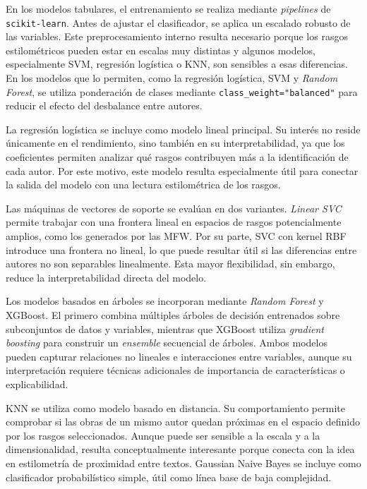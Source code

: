 \documentclass[IB]{TFUOC}%
\begin{document}
En los modelos tabulares, el entrenamiento se realiza mediante \textit{pipelines} de \texttt{scikit-learn}. Antes de ajustar el clasificador, se aplica un escalado robusto de las variables. Este preprocesamiento interno resulta necesario porque los rasgos estilométricos pueden estar en escalas muy distintas y algunos modelos, especialmente SVM, regresión logística o KNN, son sensibles a esas diferencias. En los modelos que lo permiten, como la regresión logística, SVM y \textit{Random Forest}, se utiliza ponderación de clases mediante \texttt{class\_weight="balanced"} para reducir el efecto del desbalance entre autores.

La regresión logística se incluye como modelo lineal principal. Su interés no reside únicamente en el rendimiento, sino también en su interpretabilidad, ya que los coeficientes permiten analizar qué rasgos contribuyen más a la identificación de cada autor. Por este motivo, este modelo resulta especialmente útil para conectar la salida del modelo con una lectura estilométrica de los rasgos.

Las máquinas de vectores de soporte se evalúan en dos variantes. \textit{Linear SVC} permite trabajar con una frontera lineal en espacios de rasgos potencialmente amplios, como los generados por las MFW. Por su parte, SVC con kernel RBF introduce una frontera no lineal, lo que puede resultar útil si las diferencias entre autores no son separables linealmente. Esta mayor flexibilidad, sin embargo, reduce la interpretabilidad directa del modelo.

Los modelos basados en árboles se incorporan mediante \textit{Random Forest} y XGBoost. El primero combina múltiples árboles de decisión entrenados sobre subconjuntos de datos y variables, mientras que XGBoost utiliza \textit{gradient boosting} para construir un \textit{ensemble} secuencial de árboles. Ambos modelos pueden capturar relaciones no lineales e interacciones entre variables, aunque su interpretación requiere técnicas adicionales de importancia de características o explicabilidad.

KNN se utiliza como modelo basado en distancia. Su comportamiento permite comprobar si las obras de un mismo autor quedan próximas en el espacio definido por los rasgos seleccionados. Aunque puede ser sensible a la escala y a la dimensionalidad, resulta conceptualmente interesante porque conecta con la idea en estilometría de proximidad entre textos. Gaussian Naive Bayes se incluye como clasificador probabilístico simple, útil como línea base de baja complejidad.
\end{document}
